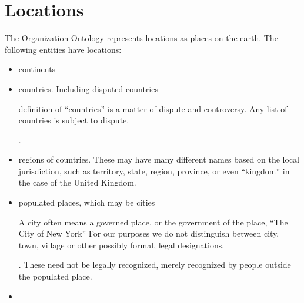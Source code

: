 \documentclass[letterpaper,10pt,english]{sphinxmanual}
\begin{document}
\chapter{Locations}
\label{\detokenize{locations:index-0}}\label{\detokenize{locations:id1}}\label{\detokenize{locations::doc}}
\sphinxAtStartPar
The Organization Ontology represents locations as places on the earth.  The following
entities have locations:
\begin{itemize}
\item {} 
\sphinxAtStartPar
continents

\item {} 
\sphinxAtStartPar
countries.  Including disputed countries \sphinxstepexplicit %
\begin{footnote}[1]\label{\thesphinxscope.1}%
\sphinxAtStartFootnote
definition of “countries” is a matter of dispute and controversy.  Any list of
countries is subject to dispute.
%
\end{footnote}.

\item {} 
\sphinxAtStartPar
regions of countries.  These may have many different names based on the local
jurisdiction, such as territory, state, region, province, or even “kingdom” in the
case of the United Kingdom.

\item {} 
\sphinxAtStartPar
populated places, which may be cities \sphinxstepexplicit %
\begin{footnote}[2]\label{\thesphinxscope.2}%
\sphinxAtStartFootnote
A city often means a governed place, or the government of the place, “The City
of New York”  For our purposes we do not distinguish between city, town, village or
other possibly formal, legal designations.
%
\end{footnote}.  These need not be legally recognized,
merely recognized by people outside the populated place.

\item {} 
\sphinxAtStartPar
{\hyperref[\detokenize{facilities::doc}]{}}

\end{itemize}
\end{document}
